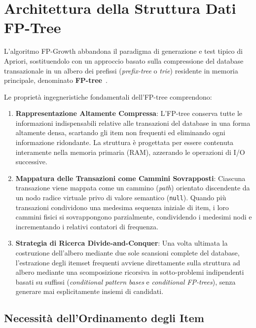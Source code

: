 \FloatBarrier
\section{Architettura della Struttura Dati FP-Tree}
\label{sec:dm-fp-tree-architecture}

L'algoritmo FP-Growth abbandona il paradigma di generazione e test tipico di Apriori, sostituendolo con un approccio basato sulla compressione del database transazionale in un albero dei prefissi (\textit{prefix-tree} o \textit{trie}) residente in memoria principale, denominato \textbf{FP-tree}~\cite{han2000}.

Le proprietà ingegneristiche fondamentali dell'FP-tree comprendono:
\begin{enumerate}
    \item \textbf{Rappresentazione Altamente Compressa}: L'FP-tree conserva tutte le informazioni indispensabili relative alle transazioni del database in una forma altamente densa, scartando gli item non frequenti ed eliminando ogni informazione ridondante. La struttura è progettata per essere contenuta interamente nella memoria primaria (RAM), azzerando le operazioni di I/O successive.
    \item \textbf{Mappatura delle Transazioni come Cammini Sovrapposti}: Ciascuna transazione viene mappata come un cammino (\textit{path}) orientato discendente da un nodo radice virtuale privo di valore semantico (\texttt{null}). Quando più transazioni condividono una medesima sequenza iniziale di item, i loro cammini fisici si sovrappongono parzialmente, condividendo i medesimi nodi e incrementando i relativi contatori di frequenza.
    \item \textbf{Strategia di Ricerca Divide-and-Conquer}: Una volta ultimata la costruzione dell'albero mediante due sole scansioni complete del database, l'estrazione degli itemset frequenti avviene direttamente sulla struttura ad albero mediante una scomposizione ricorsiva in sotto-problemi indipendenti basati su suffissi (\textit{conditional pattern bases} e \textit{conditional FP-trees}), senza generare mai esplicitamente insiemi di candidati.
\end{enumerate}

\FloatBarrier
\subsection{Necessità dell'Ordinamento degli Item}
\label{subsec:dm-item-ordering-necessity}

